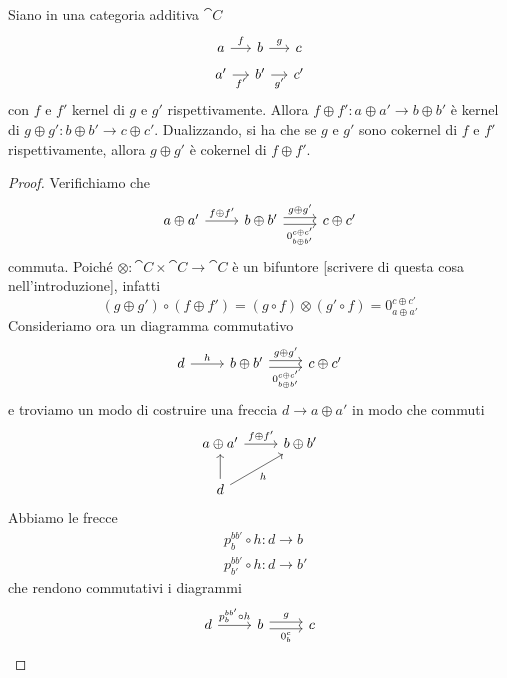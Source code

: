 \begin{lemma}\label{lemma:KerCokerOplus}
  Siano in una categoria additiva \(\cat C\)
  \[
    \begin{tikzcd}[row sep=tiny, column sep=small]
      a \ar["{f}", r] & b \ar["{g}", r] & c \\
      a' \ar["{f'}", r, swap] & b' \ar["{g'}", r, swap] & c'
    \end{tikzcd}
  \]
  con \(f\) e \(f'\) kernel di \(g\) e \(g'\) rispettivamente.  Allora
  \(f \oplus f' : a \oplus a' \to b \oplus b'\) è kernel di
  \(g \oplus g' : b \oplus b' \to c \oplus c'\). Dualizzando, si ha che se
  \(g\) e \(g'\) sono cokernel di \(f\) e \(f'\) rispettivamente,
  allora \(g \oplus g'\) è cokernel di \(f \oplus f'\).
\end{lemma}

\begin{proof}
  Verifichiamo che
  \[
    \begin{tikzcd}
      a \oplus a' \ar["{f \oplus f'}", r] & b \oplus b' \ar["{g \oplus g'}", r, shift
      left] \ar["{0_{b \oplus b'}^{c \oplus c'}}", r, shift right, swap] & c \oplus
      c'
    \end{tikzcd}
  \]
  commuta. Poiché \(\otimes : \cat C \times \cat C \to \cat C\) è un bifuntore
  {\color{red} [scrivere di questa cosa nell'introduzione]}, infatti
  \[
    (g \oplus g') \circ (f \oplus f') = (g \circ f) \otimes (g' \circ f) = 0_{a \oplus a'}^{c \oplus c'}
  \]
  Consideriamo ora un diagramma commutativo
  \[
    \begin{tikzcd}
      d \ar["{h}", r] & b \oplus b' \ar["{g \oplus g'}", r, shift left]
      \ar["{0_{b \oplus b'}^{c \oplus c'}}", r, shift right, swap] & c \oplus c'
    \end{tikzcd}
  \]
  e troviamo un modo di costruire una freccia \(d \to a \oplus a'\) in modo
  che commuti
  \[
    \begin{tikzcd}
      a \oplus a' \ar["{f \oplus f'}", r] & b \oplus b' \\
      d \ar["{h}", ur, swap] \ar["{}", u]
    \end{tikzcd}
  \]
  Abbiamo le frecce
  \begin{align*}
    & p_b^{bb'} \circ h : d \to b \\
    & p_{b'}^{bb'}\circ h : d \to b '
  \end{align*}
  che rendono commutativi i diagrammi
  \[
    \begin{tikzcd}
      d \ar["{p_b^{bb'} \circ h}", r] & b \ar["{g}", r, shift left]
      \ar["{0_b^c}", r, shift right, swap] & c

\end{tikzcd}\]
\end{proof}
